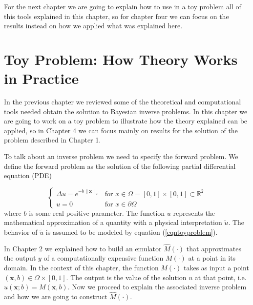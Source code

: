 \documentclass[12pt]{book}
\newcommand{\x}{\textbf{x}}
\begin{document}
 

For the next chapter we are going to explain how to use in a toy problem all of this tools explained in this 
chapter, so for chapter four we can focus on the results instead on how we applied what was explained here. 



\chapter{Toy Problem: How Theory Works in Practice}

In the previous chapter we reviewed some  of the theoretical and computational tools needed obtain
the solution to Bayesian inverse problems. In this chapter
we are going to work on a toy problem to illustrate how the theory explained can be applied, so
in Chapter 4 we can focus mainly on  results for the  solution of the problem described in Chapter 1.

To talk about an inverse problem  we  need to specify  the forward problem. 
We define the forward problem as the solution of the  following
partial differential equation (PDE)

\begin{equation}\label{eqntoyproblem}
\left\{
	\begin{array}{ll}
		\Delta u=e^{-b\|\x\|_{2}} &\mbox{for } x\in\Omega=[0,1]\times [0,1]\subset\mathbb{R}^{2} \\
		u=0 & \mbox{for } x\in\partial\Omega
	\end{array}
\right.
\end{equation} 
where $b$ is some real positive parameter. The 
function $u$ represents the mathematical approximation of  a quantity with a physical interpretation  $\tilde{u}$. The  behavior
of $\tilde{u}$ is assumed to be    modeled by equation (\ref{eqntoyproblem}).

In Chapter 2 we explained how to build an emulator $\hat{M}(\cdot)$  that approximates
the output $y$  of a computationally expensive function  $M(\cdot)$ at a point  in its domain. 
In the context of this chapter, the function $M(\cdot)$ takes as input a point  $(\textbf{x},b)\in\Omega\times [0,1]$. The
output is the value of the solution $u$ at that 
point, i.e. $u(\textbf{x};b)=M(\textbf{x},b)$. Now we proceed to explain the associated inverse problem and  how we are going to construct $\hat{M}(\cdot)$.  
\end{document}
